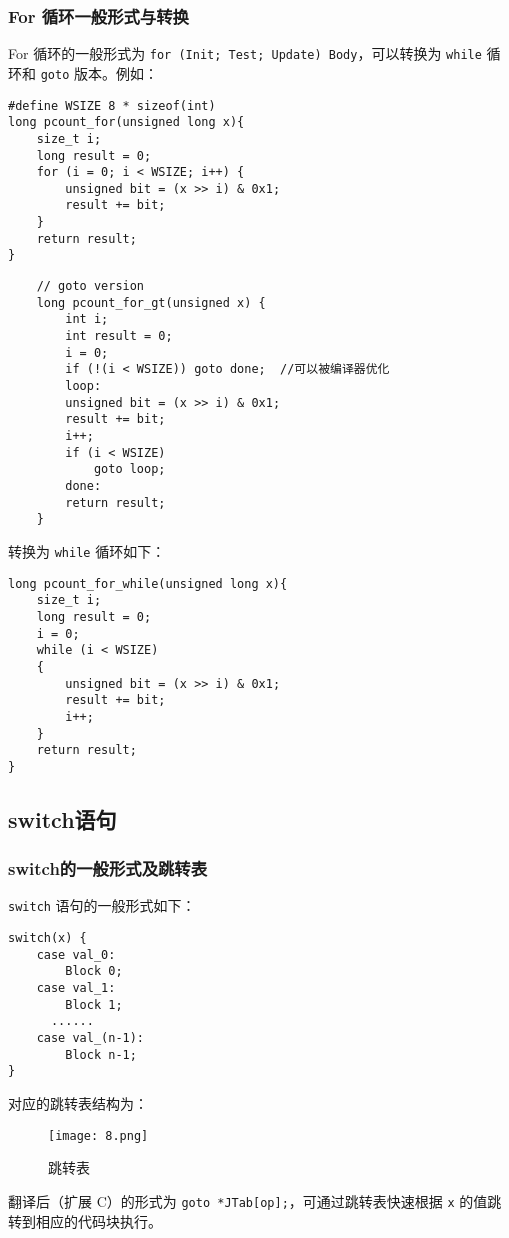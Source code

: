 \subsubsection{For 循环一般形式与转换}
For 循环的一般形式为 \texttt{for (Init; Test; Update) Body}，可以转换为 \texttt{while} 循环和 \texttt{goto} 版本。例如：
\begin{multicols}{2}
    \begin{verbatim}
#define WSIZE 8 * sizeof(int)
long pcount_for(unsigned long x){
    size_t i;
    long result = 0;
    for (i = 0; i < WSIZE; i++) {
        unsigned bit = (x >> i) & 0x1;
        result += bit;
    }
    return result;
}
\end{verbatim}
\columnbreak
\begin{verbatim}
    // goto version
    long pcount_for_gt(unsigned x) {
        int i;
        int result = 0;
        i = 0;
        if (!(i < WSIZE)) goto done;  //可以被编译器优化
        loop:
        unsigned bit = (x >> i) & 0x1;
        result += bit;
        i++;
        if (i < WSIZE)
            goto loop;
        done:
        return result;
    }
    \end{verbatim}
\end{multicols}

转换为 \texttt{while} 循环如下：
\begin{verbatim}
long pcount_for_while(unsigned long x){
    size_t i;
    long result = 0;
    i = 0;
    while (i < WSIZE)
    {
        unsigned bit = (x >> i) & 0x1;
        result += bit;
        i++;
    }
    return result;
}
\end{verbatim}

\subsection{switch语句}
\subsubsection{switch的一般形式及跳转表}

\texttt{switch} 语句的一般形式如下：
\begin{verbatim}
switch(x) {
    case val_0:
        Block 0;
    case val_1:
        Block 1;
      ......
    case val_(n-1):
        Block n-1;
}
    \end{verbatim}
对应的跳转表结构为：
\begin{figure}[H]
    \centering
    \captionsetup{skip=4pt}
    \texttt{[image: 8.png]}
    \caption{跳转表}
\end{figure}
翻译后（扩展 C）的形式为 \texttt{goto *JTab[op];}，可通过跳转表快速根据 \texttt{x} 的值跳转到相应的代码块执行。


